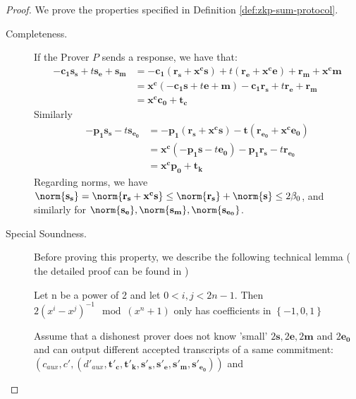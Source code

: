\begin{proof}
  We prove the properties specified in Definition \ref{def:zkp-sum-protocol}.
  \begin{description}
  \item[Completeness.] If the Prover $P$ sends a response, we have that:
    \begin{align*}
      -\mathbf{c_1s_s} + t\mathbf{s_e} + \mathbf{s_m} &= -\mathbf{c_1(r_s +
                                                        x^cs)} + t(\mathbf{r_e + x^ce}) + \mathbf{r_m + x^cm} \\
                                                      &= \mathbf{x^c}(-\mathbf{c_1s} +t\mathbf{e} + \mathbf{m})
                                                        -\mathbf{c_1r_s} + t\mathbf{r_e} + \mathbf{r_m}\\
                                                      &=\mathbf{x^cc_0} + \mathbf{t_c}
    \end{align*}
    Similarly
    \begin{align*}
      -\mathbf{p_1s_s} -t\mathbf{s_{e_0}} &= -\mathbf{p_1(r_s +
                                            x^cs) - t(\mathbf{r_{e_0} + x^ce_0})}\\
                                          &= \mathbf{x^c}(\mathbf{-p_1s} - t\mathbf{e_0}) -\mathbf{p_1r_s}
                                            -t\mathbf{r_{e_0}} \\
                                          &= \mathbf{x^cp_0 + t_k}
    \end{align*}
    Regarding norms, we have $\norm{\mathbf{s_s}} = \norm{\mathbf{r_s +
        x^cs}} \leq
    \norm{\mathbf{r_s}} + \norm{\mathbf{s}} \leq 2\beta_0$, and
    similarly for $\mathbf{\norm{s_e}, \norm{s_m}, \norm{s_{e_0}}}$.
  \item [Special Soundness.] Before proving this property, we describe the
    following technical lemma ( the detailed proof can be found in
    \cite{benhamouda2014better})
    \begin{lemma}
      Let n be a power of 2 and let $0 <i,j< 2n-1$. Then $2(x^i -
      x^j)^{-1} \mod (x^n +1)$ only has coefficients in $\left\{ -1,
        0, 1
      \right\}$
      \label{lem:speicalBinomial}
    \end{lemma}
    Assume that a dishonest prover does not know 'small'
    $2\mathbf{s}, 2\mathbf{e}, 2\mathbf{m}$ and $2\mathbf{e_0}$ and can
    output different accepted transcripts of a same commitment: $(c_{aux}, c',
    (d'_{aux},\mathbf{t'_c, t'_k, s'_s, s'_e, s'_m, s'_{e_0}}))$ and

\end{description}
\end{proof}
